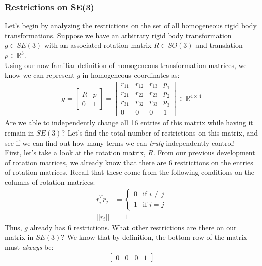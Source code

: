 \documentclass[oneside]{book}
\begin{document}
\subsubsection{Restrictions on SE(3)}
Let's begin by analyzing the restrictions on the set of all homogeneous rigid body transformations. Suppose we have an arbitrary rigid body transformation $g \in SE(3)$ with an associated rotation matrix $R \in SO(3)$ and translation $p \in \mathbb{R}^3$.\\
Using our now familiar definition of homogeneous transformation matrices, we know we can represent $g$ in homogeneous coordinates as:
\begin{align}
    g = 
    \begin{bmatrix}
    R & p\\
    0 & 1
    \end{bmatrix}
    = 
    \begin{bmatrix}
    r_{11} & r_{12} & r_{13} & p_1\\
    r_{21}  & r_{22}  & r_{23} & p_2\\
    r_{31}  & r_{32}  & r_{33} & p_3\\
    0 & 0 & 0 & 1
    \end{bmatrix}
    \in \mathbb{R}^{4\times 4}
\end{align}
Are we able to independently change all 16 entries of this matrix while having it remain in $SE(3)$? Let's find the total number of restrictions on this matrix, and see if we can find out how many terms we can \textit{truly} independently control!\\
First, let's take a look at the rotation matrix, $R$. From our previous development of rotation matrices, we already know that there are 6 restrictions on the entries of rotation matrices. Recall that these come from the following conditions on the columns of rotation matrices:
\begin{align}
    r_i^Tr_j &= \begin{cases}
        0 & \text{if } i \neq j\\
        1 & \text{if } i = j
    \end{cases}\\
    ||r_i|| &= 1
\end{align}
Thus, $g$ already has $6$ restrictions. What other restrictions are there on our matrix in $SE(3)$? We know that by definition, the bottom row of the matrix must \textit{always} be:
\begin{align}
    \begin{bmatrix}
    0 & 0 & 0 & 1
    \end{bmatrix}
\end{align}
\end{document}
